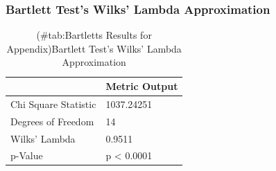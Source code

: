 \documentclass[american,]{article}
\begin{document}
\hypertarget{bartlett-tests-wilks-lambda-approximation}{%
\subsubsection{Bartlett Test's Wilks' Lambda Approximation}\label{bartlett-tests-wilks-lambda-approximation}}

\begin{table}[t]

\caption{(\#tab:Bartletts Results for Appendix)Bartlett Test's Wilks' Lambda Approximation}
\centering
\begin{tabular}{ll}
\toprule
  & Metric Output\\
\midrule
Chi Square Statistic & 1037.24251\\
Degrees of Freedom & 14\\
Wilks' Lambda & 0.9511\\
p-Value & p < 0.0001\\
\bottomrule
\end{tabular}
\end{table}


\end{document}
